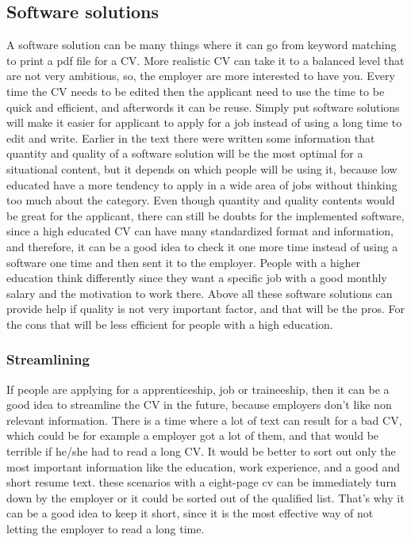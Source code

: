 \subsection{Software solutions}
A software solution can be many things where it can go from keyword matching to print a pdf file for a CV.
More realistic CV can take it to a balanced level that are not very ambitious, 
so, the employer are more interested to have you. Every time the CV needs to be edited
then the applicant need to use the time to be quick and efficient, and afterwords it can be reuse.
Simply put software solutions will make it easier for applicant to apply for a job instead of using a long time to edit and write. 
Earlier in the text there were written some information 
that quantity and quality of a software solution will be the most optimal for a situational content,
but it depends on which people will be using it, because low educated have a more tendency to apply
in a wide area of jobs without thinking too much about the category. 
Even though quantity and quality contents would be great for the applicant, 
there can still be doubts for the implemented software, since a high educated CV can have many standardized format and information,
and therefore, it can be a good idea to check it one more time instead of using a software one time and then sent it to the employer.
People with a higher education think differently since they want a specific job
with a good monthly salary and the motivation to work there. 
Above all these software solutions can provide help if quality is not very important factor,
and that will be the pros. For the cons that will be less efficient for people with a high education.

\subsubsection{Streamlining}
If people are applying for a apprenticeship, job or traineeship, 
then it can be a good idea to streamline the CV in the future, because employers don't like non relevant information.
There is a time where a lot of text can result for a bad CV, which could be for example a employer got a lot of them,
and that would be terrible if he/she had to read a long CV. It would be better to sort out only the most important information 
like the education, work experience, and a good and short resume text. 
these scenarios with a eight-page cv can be immediately turn down by the employer or it could be sorted out of the qualified list.
That's why it can be a good idea to keep it short, since it is the most effective way of not letting the employer to read a long time.

